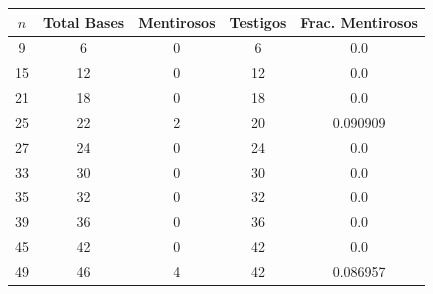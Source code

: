 \begin{tabular}{ccccc}
\toprule
$n$ & Total Bases & Mentirosos & Testigos & Frac. Mentirosos \\
\midrule
9 & 6 & 0 & 6 & 0.0 \\
15 & 12 & 0 & 12 & 0.0 \\
21 & 18 & 0 & 18 & 0.0 \\
25 & 22 & 2 & 20 & 0.090909 \\
27 & 24 & 0 & 24 & 0.0 \\
33 & 30 & 0 & 30 & 0.0 \\
35 & 32 & 0 & 32 & 0.0 \\
39 & 36 & 0 & 36 & 0.0 \\
45 & 42 & 0 & 42 & 0.0 \\
49 & 46 & 4 & 42 & 0.086957 \\
\bottomrule
\end{tabular}
